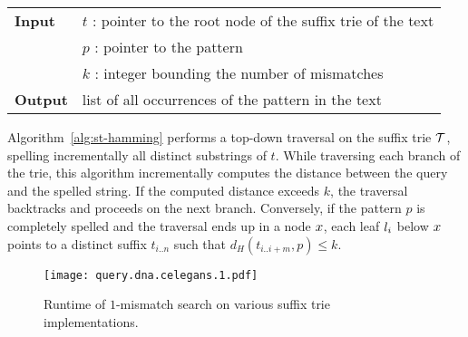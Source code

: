 \begin{figure*}[h!]
\begin{center}
\begin{minipage}[t]{.8\textwidth}
\begin{algorithm}[H]
\begin{tabular}{ll}
\textbf{Input}  & $t$ : pointer to the root node of the suffix trie of the text\\
 			    & $p$ : pointer to the pattern\\
 			    & $k$ : integer bounding the number of mismatches\\
\textbf{Output} & list of all occurrences of the pattern in the text\\
\end{tabular}
\begin{algorithmic}[1]
\Else
		\State \Report {}
		\Repeat
			\State {}
			\State {}
			\State {}
		\Until {}
	\EndIf
\EndIf
\end{algorithmic}
\label{alg:st-hamming}
\end{algorithm}
\end{minipage}
\end{center}
\end{figure*}

Algorithm~\ref{alg:st-hamming} performs a top-down traversal on the suffix trie $\mathcal {T}$, spelling incrementally all distinct substrings of $t$.
While traversing each branch of the trie, this algorithm incrementally computes the distance between the query and the spelled string.
If the computed distance exceeds $k$, the traversal backtracks and proceeds on the next branch.
Conversely, if the pattern $p$ is completely spelled and the traversal ends up in a node $x$, each leaf $l_i$ below $x$ points to a distinct suffix $t_{i..n}$ such that $d_H(t_{i..i+m}, p) \leq k$.


\begin{figure}[b]
\begin{center}
\caption[$k$-mismatches runtime]{Runtime of $1$-mismatch search on various suffix trie implementations.}
\label{fig:query-dna-apx}
\texttt{[image: query.dna.celegans.1.pdf]}
\end{center}
\end{figure}

